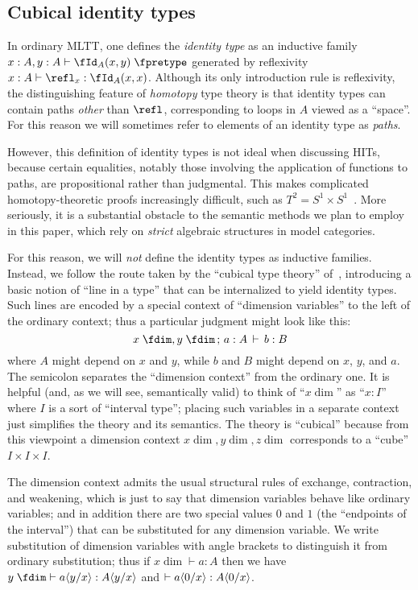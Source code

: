 \documentclass{amsart}
\begin{document}
\subsection{Cubical identity types}
\label{sec:cubic-ident-types}


In ordinary MLTT, one defines the \emph{identity type} as an inductive family $\jd{x:A,y:A}{\id[A]{x}{y} \pretype}$ generated by reflexivity $\jd{x:A}{\refl_x : \id[A]xx}$.
Although its only introduction rule is reflexivity, the distinguishing feature of \emph{homotopy} type theory is that identity types can contain paths \emph{other} than $\refl$, corresponding to loops in $A$ viewed as a ``space''.
For this reason we will sometimes refer to elements of an identity type as \emph{paths}.

However, this definition of identity types is not ideal when discussing HITs, because certain equalities, notably those involving the application of functions to paths, are propositional rather than judgmental.
This makes complicated homotopy-theoretic proofs increasingly difficult, such as $T^2 = S^1\times S^1$~\cite{lb:torus}.
More seriously, it is a substantial obstacle to the semantic methods we plan to employ in this paper, which rely on \emph{strict} algebraic structures in model categories.

For this reason, we will \emph{not} define the identity types as inductive families.
Instead, we follow the route taken by the ``cubical type theory'' of~\cite{lb:cubical-tt}, introducing a basic notion of ``line in a type'' that can be internalized to yield identity types.
Such lines are encoded by a special context of ``dimension variables'' to the left of the ordinary context; thus a particular judgment might look like this:
\[ x\dim, y\dim \cb a:A \pr b:B \]
where $A$ might depend on $x$ and $y$, while $b$ and $B$ might depend on $x$, $y$, and $a$.
The semicolon separates the ``dimension context'' from the ordinary one.
It is helpful (and, as we will see, semantically valid) to think of ``$x\dim$'' as ``$x:I$'' where $I$ is a sort of ``interval type'';
placing such variables in a separate context just simplifies the theory and its semantics.
The theory is ``cubical'' because from this viewpoint a dimension context $x\dim, y\dim, z\dim$ corresponds to a ``cube'' $I\times I\times I$.

The dimension context admits the usual structural rules of exchange, contraction, and weakening, which is just to say that dimension variables behave like ordinary variables; and in addition there are two special values $0$ and $1$ (the ``endpoints of the interval'') that can be substituted for any dimension variable.
We write substitution of dimension variables with angle brackets to distinguish it from ordinary substitution; thus if $x\dim \vdash a:A$ then we have $y\dim \vdash a\dsubst{y}{x} : A\dsubst{y}{x}$ and $\vdash a\langle 0/x\rangle : A\langle 0/x\rangle$.
\end{document}
